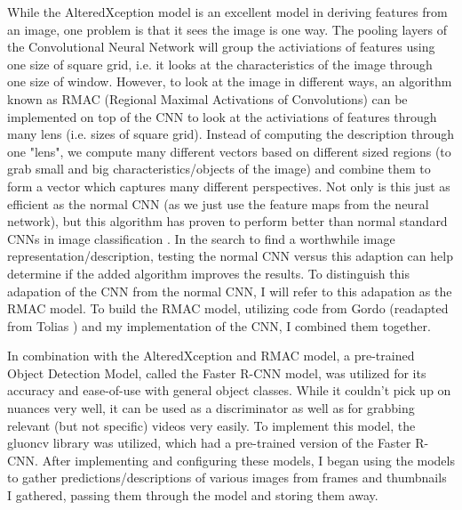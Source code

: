 \documentclass[10pt,twocolumn]{article}
\begin{document}
While the AlteredXception model is an excellent model in deriving features from an image, one problem is that it sees the image is one way. The pooling layers of the Convolutional Neural Network will group the activiations of features using one size of square grid, i.e. it looks at the characteristics of the image through one size of window. However, to look at the image in different ways, an algorithm known as RMAC (Regional Maximal Activations of Convolutions) can be implemented on top of the CNN to look at the activiations of features through many lens (i.e. sizes of square grid). Instead of computing the description through one "lens", we compute many different vectors based on different sized regions (to grab small and big characteristics/objects of the image) and combine them to form a vector which captures many different perspectives. Not only is this just as efficient as the normal CNN (as we just use the feature maps from the neural network), but this algorithm has proven to perform better than normal standard CNNs in image classification \cite{Tolias2016}. In the search to find a worthwhile image representation/description, testing the normal CNN versus this adaption can help determine if the added algorithm improves the results. To distinguish this adapation of the CNN from the normal CNN, I will refer to this adapation as the RMAC model. To build the RMAC model, utilizing code from Gordo \cite{Gordo2016} (readapted from Tolias \cite{Tolias2016}) and my implementation of the CNN, I combined them together.

In combination with the AlteredXception and RMAC model, a pre-trained Object Detection Model, called the Faster R-CNN model, was utilized for its accuracy and ease-of-use with general object classes. While it couldn't pick up on nuances very well, it can be used as a discriminator as well as for grabbing relevant (but not specific) videos very easily. To implement this model, the gluoncv library was utilized, which had a pre-trained version of the Faster R-CNN. After implementing and configuring these models, I began using the models to gather predictions/descriptions of various images from frames and thumbnails I gathered, passing them through the model and storing them away.
\end{document}
